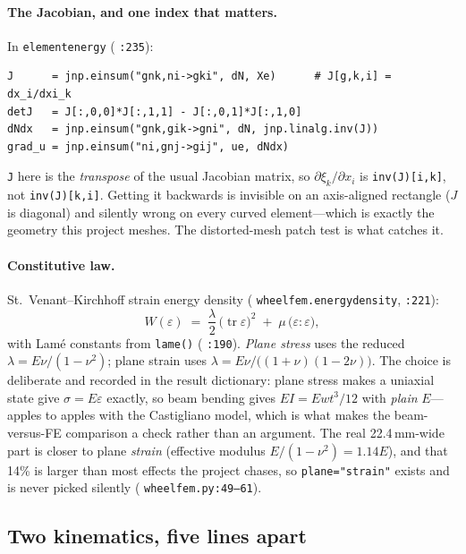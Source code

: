 \documentclass[11pt,a4paper]{article}
\DeclareRobustCommand{\code}[1]{%
  \texttt{\small\def\_{\textunderscore\discretionary{}{}{}}#1}}
\newcommand{\at}[2]{\code{#1:#2}}
\begin{document}
\paragraph{The Jacobian, and one index that matters.}
In \code{element\_energy} (\code{:235}):

\begin{lstlisting}[style=py]
J      = jnp.einsum("gnk,ni->gki", dN, Xe)      # J[g,k,i] = dx_i/dxi_k
detJ   = J[:,0,0]*J[:,1,1] - J[:,0,1]*J[:,1,0]
dNdx   = jnp.einsum("gnk,gik->gni", dN, jnp.linalg.inv(J))
grad_u = jnp.einsum("ni,gnj->gij", ue, dNdx)
\end{lstlisting}

\code{J} here is the \emph{transpose} of the usual Jacobian matrix, so
$\partial \xi_k/\partial x_i$ is \code{inv(J)[i,k]}, not \code{inv(J)[k,i]}. Getting it
backwards is invisible on an axis-aligned rectangle ($J$ is diagonal) and silently
wrong on every curved element---which is exactly the geometry this project meshes. The
distorted-mesh patch test is what catches it.

\paragraph{Constitutive law.}
St.\ Venant--Kirchhoff strain energy density
(\code{wheel\_fem.\_energy\_density}, \code{:221}):
%
\begin{equation}
  W(\varepsilon) \;=\; \frac{\lambda}{2}\,\bigl(\operatorname{tr}\varepsilon\bigr)^2
                  \;+\; \mu\,\bigl(\varepsilon : \varepsilon\bigr),
  \label{eq:svk}
\end{equation}
%
with Lam\'e constants from \code{lame()} (\code{:190}). \emph{Plane stress} uses the
reduced $\lambda = E\nu/(1-\nu^2)$; plane strain uses
$\lambda = E\nu/\bigl((1+\nu)(1-2\nu)\bigr)$. The choice is deliberate and recorded in
the result dictionary: plane stress makes a uniaxial state give $\sigma = E\varepsilon$
exactly, so beam bending gives $EI = E w t^3/12$ with \emph{plain} $E$---apples to
apples with the Castigliano model, which is what makes the beam-versus-FE comparison a
check rather than an argument. The real 22.4\,mm-wide part is closer to plane
\emph{strain} (effective modulus $E/(1-\nu^2) = 1.14E$), and that 14\% is larger than
most effects the project chases, so \code{plane="strain"} exists and is never picked
silently (\at{wheel\_fem.py}{49--61}).

\subsection{Two kinematics, five lines apart}
\label{sec:kinematics}
\end{document}
